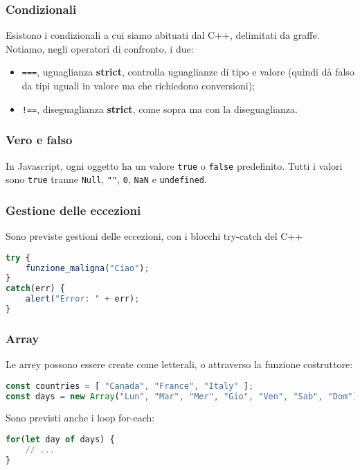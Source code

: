 \documentclass[a4paper,11pt]{article}
\begin{document}
\subsubsection{Condizionali}
Esistono i condizionali a cui siamo abituati dal C++, delimitati da graffe.
Notiamo, negli operatori di confronto, i due:
\begin{itemize}
	\item \lstinline|===|, uguaglianza \textbf{strict}, controlla uguaglianze di tipo e valore (quindi dà falso da tipi uguali in valore ma che richiedono conversioni);
	\item \lstinline|!==|, diseguaglianza \textbf{strict}, come sopra ma con la diseguaglianza.
\end{itemize}

\subsubsection{Vero e falso}
In Javascript, ogni oggetto ha un valore \lstinline|true| o \lstinline|false| predefinito.
Tutti i valori sono \lstinline|true| tranne \lstinline|Null|, \lstinline|""|, \lstinline|0|, \lstinline|NaN| e \lstinline|undefined|.

\subsubsection{Gestione delle eccezioni}
Sono previste gestioni delle eccezioni, con i blocchi try-catch del C++
\begin{lstlisting}[language=javascript, style=codestyle]	
try {
	funzione_maligna("Ciao");
}
catch(err) {
	alert("Error: " + err);
}
\end{lstlisting}

\subsubsection{Array}
Le arrey possono essere create come letterali, o attraverso la funzione costruttore:
\begin{lstlisting}[language=javascript, style=codestyle]	
const countries = [ "Canada", "France", "Italy" ];
const days = new Array("Lun", "Mar", "Mer", "Gio", "Ven", "Sab", "Dom");
\end{lstlisting}

Sono previsti anche i loop for-each:
\begin{lstlisting}[language=javascript, style=codestyle]	
for(let day of days) {
	// ...
}
\end{lstlisting}
\end{document}
